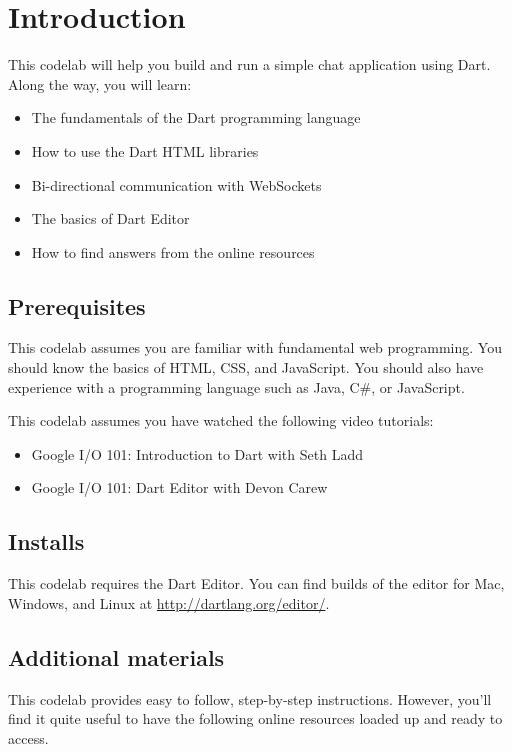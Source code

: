 \section{Introduction}

This codelab will help you build and run a simple chat application using Dart. Along the way, you will learn:

\begin{itemize}
\item The fundamentals of the Dart programming language
\item How to use the Dart HTML libraries
\item Bi-directional communication with WebSockets
\item The basics of Dart Editor
\item How to find answers from the online resources
\end{itemize}

\subsection{Prerequisites}

This codelab assumes you are familiar with fundamental web programming. You should know the basics of HTML, CSS, and JavaScript. You should also have experience with a programming language such as Java, C\#, or JavaScript.

This codelab assumes you have watched the following video tutorials:

\begin{itemize}
\item Google I/O 101: Introduction to Dart with Seth Ladd
\item Google I/O 101: Dart Editor with Devon Carew
\end{itemize}

\subsection{Installs}

This codelab requires the Dart Editor. You can find builds of the editor for Mac, Windows, and Linux at \url{http://dartlang.org/editor/}.

\subsection{Additional materials}

This codelab provides easy to follow, step-by-step instructions. However, you’ll find it quite useful to have the following online resources loaded up and ready to access.

